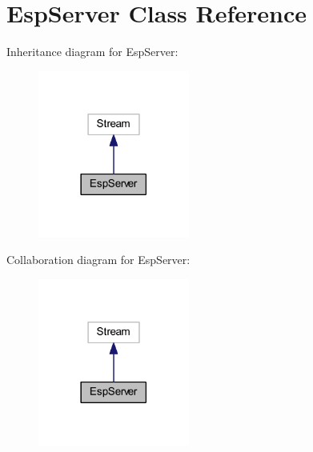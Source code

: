 \hypertarget{class_esp_server}{}\section{Esp\+Server Class Reference}
\label{class_esp_server}


Inheritance diagram for Esp\+Server\+:\nopagebreak
\begin{figure}[H]
\begin{center}
\leavevmode
\includegraphics[width=141pt]{class_esp_server__inherit__graph}
\end{center}
\end{figure}


Collaboration diagram for Esp\+Server\+:\nopagebreak
\begin{figure}[H]
\begin{center}
\leavevmode
\includegraphics[width=141pt]{class_esp_server__coll__graph}
\end{center}
\end{figure}
